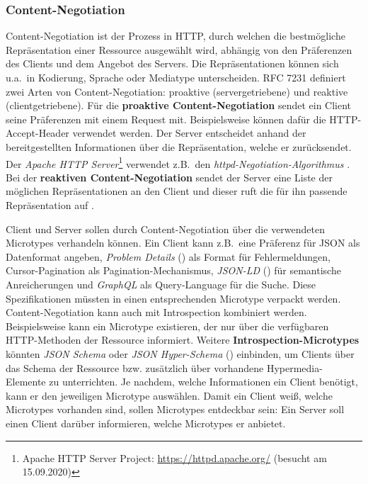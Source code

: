 \subsubsection{Content-Negotiation}
Content-Negotiation ist der Prozess in HTTP, durch welchen die bestmögliche Repräsentation einer Ressource ausgewählt wird, abhängig von den Präferenzen des Clients und dem Angebot des Servers. Die Repräsentationen können sich u.a.\ in Kodierung, Sprache oder Mediatype unterscheiden. RFC 7231 definiert zwei Arten von Content-Negotiation: proaktive (servergetriebene) und reaktive (clientgetriebene). Für die \textbf{proaktive Content-Negotiation} sendet ein Client seine Präferenzen mit einem Request mit. Beispielsweise können dafür die HTTP-Accept-Header verwendet werden. Der Server entscheidet anhand der bereitgestellten Informationen über die Repräsentation, welche er zurücksendet. Der \emph{Apache HTTP Server}\footnote{Apache HTTP Server Project: \url{https://httpd.apache.org/} (besucht am 15.09.2020)} verwendet z.B.\ den \emph{httpd-Negotiation-Algorithmus} \autocite{ApacheServer_Conneg}. Bei der \textbf{reaktiven Content-Negotiation} sendet der Server eine Liste der möglichen Repräsentationen an den Client und dieser ruft die für ihn passende Repräsentation auf \autocite{RFC7231}.

Client und Server sollen durch Content-Negotiation über die verwendeten Microtypes verhandeln können. Ein Client kann z.B.\ eine Präferenz für JSON als Datenformat angeben, \textit{Problem Details} (\autocite{RFC7807}) als Format für Fehlermeldungen, Cursor-Pagination als Pagination-Mechanismus, \textit{JSON-LD} (\autocite{JsonLD}) für semantische Anreicherungen und \textit{GraphQL} als Query-Language für die Suche. Diese Spezifikationen müssten in einen entsprechenden Microtype verpackt werden. Content-Negotiation kann auch mit Introspection kombiniert werden. Beispielsweise kann ein Microtype existieren, der nur über die verfügbaren HTTP-Methoden der Ressource informiert. Weitere \textbf{Introspection-Microtypes} könnten \textit{JSON Schema} oder \textit{JSON Hyper-Schema} (\autocite{JsonHyperSchema}) einbinden, um Clients über das Schema der Ressource bzw. zusätzlich über vorhandene Hypermedia-Elemente zu unterrichten. Je nachdem, welche Informationen ein Client benötigt, kann er den jeweiligen Microtype auswählen. Damit ein Client weiß, welche Microtypes vorhanden sind, sollen Microtypes entdeckbar sein: Ein Server soll einen Client darüber informieren, welche Microtypes er anbietet.

